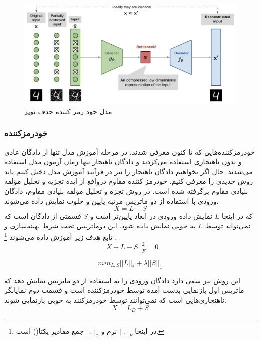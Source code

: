 \documentclass[12pt,a4paper]{report}
\theoremstyle{definition}
\theoremstyle{definition}
\begin{document}
\begin{figure}[!h]
	\begin{center}
		\includegraphics[width=\linewidth]{./images/figures/dae.png}
	\end{center}
	\caption{مدل خود رمز کننده حذف نویز}
	\label{fig:dae}
	\centering
\end{figure}

\subsubsection{خودرمزکننده }
خودرمزکننده‌هایی که تا کنون معرفی شدند، در مرحله آموزش مدل تنها از دادگان عادی و بدون ناهنجاری استفاده می‌کردند و دادگان ناهنجار تنها زمان آزمون مدل استفاده می‌شدند. حال اگر بخواهیم دادگان ناهنجار را نیز در فرآیند آموزش مدل دخیل کنیم باید روش جدیدی را معرفی کنیم. خودرمز کننده مقاوم درواقع از ایده تجزیه و تحلیل مؤلفه بنیادی مقاوم برگرفته شده است. در روش تجزه و تحلیل مؤلفه 
بنیادی مقاوم، دادگان ورودی با استفاده از دو ماتریس مرتبه پایین و خلوت نمایش داده می‌شوند.
\begin{equation}
	X = L + S
\end{equation}
که در اینجا $L$ نمایش داده ورودی در ابعاد پایین‌تر است و $S$ قسمتی از دادگان است که نمی‌تواند توسط $L$ به خوبی نمایش داده شود. این دوماتریس تحت شرط بهینه‌سازی و تابع هدف زیر آموزش داده می‌شوند
\footnote{
در اینجا
 $||.||_F$ 
نرم  و 
$||.||_*$
 جمع مقادیر یکتا() است.
}
.
\begin{equation}
	||X-L-S||_F^2 = 0
\end{equation}

\begin{equation}
	min_{L,S} ||L||_* + \lambda||S||_1
\end{equation}

این روش نیز سعی دارد دادگان ورودی را به استفاده از دو ماتریس نمایش دهد که ماتریس اول بازنمایی بدست آمده توسط خودرمزکننده است و قسمت دوم نمایانگر ناهنجاری‌هایی است که نمی‌توانند توسط خودرمزکنند به خوبی بازنمایی شوند.
\begin{equation}
X = L_D + S
\end{equation}
\end{document}
